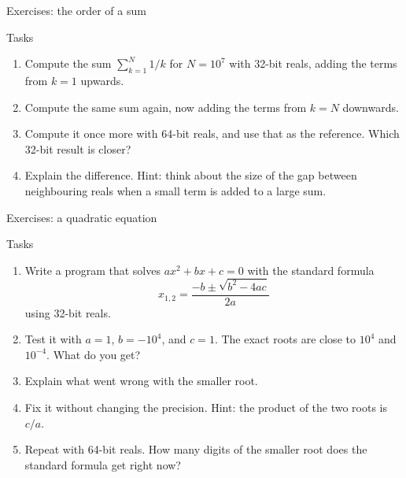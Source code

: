 \begin{frame}{Exercises: the order of a sum}
  \begin{block}{Tasks}
    \begin{enumerate}
      \item Compute the sum $\sum_{k=1}^{N} 1/k$ for $N = 10^7$ with 32-bit reals, adding the terms from $k = 1$ upwards.
      \item Compute the same sum again, now adding the terms from $k = N$ downwards.
      \item Compute it once more with 64-bit reals, and use that as the reference. Which 32-bit result is closer?
      \item Explain the difference. Hint: think about the size of the gap between neighbouring reals when a small term is added to a large sum.
    \end{enumerate}
  \end{block}
\end{frame}


\begin{frame}{Exercises: a quadratic equation}
  \begin{block}{Tasks}
    \begin{enumerate}
      \item Write a program that solves $a x^2 + b x + c = 0$ with the standard formula
        \[ x_{1,2} = \frac{-b \pm \sqrt{b^2 - 4ac}}{2a} \]
        using 32-bit reals.
      \item Test it with $a = 1$, $b = -10^4$, and $c = 1$. The exact roots are close to $10^4$ and $10^{-4}$. What do you get?
      \item Explain what went wrong with the smaller root.
      \item Fix it without changing the precision. Hint: the product of the two roots is $c/a$.
      \item Repeat with 64-bit reals. How many digits of the smaller root does the standard formula get right now?
    \end{enumerate}
  \end{block}
\end{frame}

